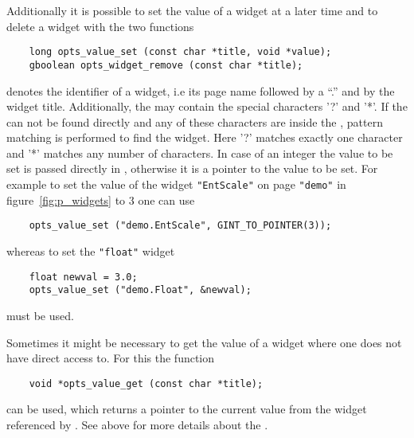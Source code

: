 Additionally it is possible to set the value of a widget at a later
time and to delete a widget with the two functions 
\begin{small}
\linespread{0.9}
\begin{verbatim}
    long opts_value_set (const char *title, void *value);
    gboolean opts_widget_remove (const char *title);
\end{verbatim}
\end{small}
 denotes the identifier of a widget, i.e its page name
followed by a ``.'' and by the widget title. Additionally, the
 may contain the special characters '?' and '*'. If the
 can not be found directly and any of these characters
are inside the , pattern matching is performed to find
the widget. Here '?' matches exactly one character and '*' matches
any number of characters. In case of an integer the value to be set
is passed directly in , otherwise it is a pointer to the
value to be set. For example to set the value of the widget
\verb|"EntScale"| on page \verb|"demo"| in
figure~\ref{fig:p_widgets} to 3 one can use
\begin{small}
\linespread{0.9}
\begin{verbatim}
    opts_value_set ("demo.EntScale", GINT_TO_POINTER(3));
\end{verbatim}
\end{small}
whereas to set the \verb|"float"| widget
\begin{small}
\linespread{0.9}
\begin{verbatim}
    float newval = 3.0;
    opts_value_set ("demo.Float", &newval);
\end{verbatim}
\end{small}
must be used.

Sometimes it might be necessary to get the value of a widget where
one does not have direct access to. For this the function
\begin{small}
\linespread{0.9}
\begin{verbatim}
    void *opts_value_get (const char *title);
\end{verbatim}
\end{small}
can be used, which returns a pointer to the current value from the
widget referenced by . See  above
for more details about the .

